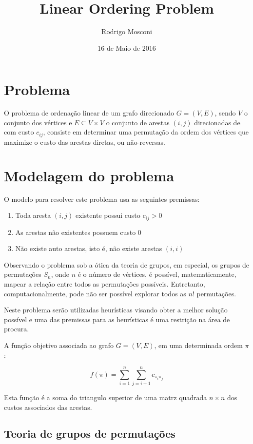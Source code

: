 \documentclass[a4paper,10pt,onecolumn]{article}
\author{Rodrigo Mosconi}
\title{Linear Ordering Problem}
\date{16 de Maio de 2016}
\begin{document}
\maketitle
\tableofcontents

\section{Problema}

O problema de ordenação linear de um grafo direcionado $G=(V,E)$, sendo $V$ o
conjunto dos vértices e $E \subseteq V\times V$ o conjunto de arestas $(i,j)$
direcionadas de com custo $c_{ij}$, consiste em determinar uma permutação da
ordem dos vértices que maximize o custo das arestas diretas, ou não-reversas.

\section{Modelagem do problema}

O modelo para resolver este problema usa as seguintes premissas:
\begin{enumerate}
\item Toda aresta $(i,j)$ existente possui custo $c_{ij}>0$
\item As arestas não existentes possuem custo $0$
\item Não existe auto arestas, isto é, não existe arestas $(i,i)$
\end{enumerate}

Observando o problema sob a ótica da teoria de grupos, em especial, os grupos
de permutações $S_n$, onde $n$ é o número de vértices, é possível,
matematicamente, mapear a relação entre todos as permutações possíveis.
Entretanto, computacionalmente, pode não ser possível explorar todos as $n!$
permutações.  

Neste problema serão utilizadas heurísticas visando obter a melhor solução
possível e uma das premissas para as heurísticas é uma restrição na área de
procura.

A função objetivo associada ao  grafo $G=(V,E)$, em uma determinada ordem $\pi$:

\begin{equation}
  f(\pi)=\sum^n_{i=1}\sum^n_{j=i+1}c_{\pi_i\pi_j}
\end{equation}

Esta função é a soma do triangulo superior de uma matrz quadrada $n\times n$
dos custos associados das arestas.

\subsection{Teoria de grupos de permutações}
\end{document}
